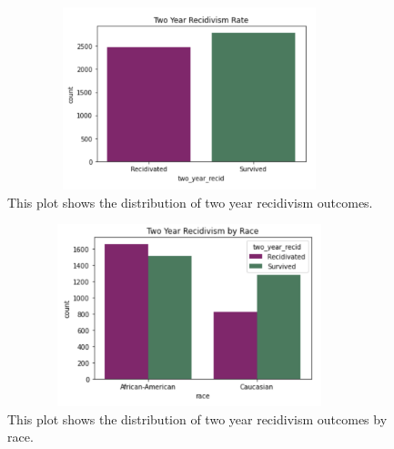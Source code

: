 \documentclass[water,article,submit,moreauthors,pdftex]{mdpi}
\begin{document}
\begin{figure}

{\centering \includegraphics[width=400px,height=200px]{../images/recid_bar_plot} 

}

\caption{This plot shows the distribution of two year recidivism outcomes.}\label{fig:recid plot}
\end{figure}

\begin{figure}

{\centering \includegraphics[width=400px,height=200px]{../images/race_recid_plot} 

}

\caption{This plot shows the distribution of two year recidivism outcomes by race.}\label{fig:recid race plot}
\end{figure}

%

\vspace{6pt}
\end{document}
